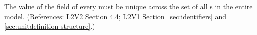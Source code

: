 The value of the  field of every \UnitDefinition must be
unique across the set of all \UnitDefinition{}s in the entire
model.  (References: L2V2 Section 4.4; L2V1
Section~\ref{sec:identifiers} and
\ref{sec:unitdefinition-structure}.)
